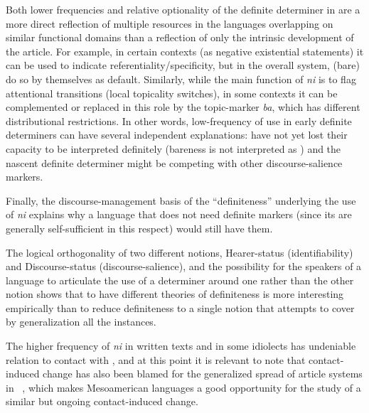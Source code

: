\documentclass[output=paper
,modfonts
,nonflat]{langsci/langscibook}
\begin{document}
Both lower frequencies and relative optionality of the definite determiner in  are a more direct reflection of multiple resources in the languages overlapping on similar functional domains than a reflection of only the intrinsic development of the article. For example, in certain contexts (as negative existential statements) it can be used to indicate referentiality/specificity, but in the overall system, (bare)  do so by themselves as default. Similarly, while the main function of \textit{ni} is to flag attentional transitions (local topicality switches), in some contexts it can be complemented or replaced in this role by the topic-marker \textit{ba}, which has different distributional restrictions. In other words, low-frequency of use in early definite determiners can have several independent explanations:  have not yet lost their capacity to be interpreted definitely (bareness is not interpreted as ) and the nascent definite determiner might be competing with other discourse-salience markers.

Finally, the discourse-management basis of the ``definiteness'' underlying the use of \textit{ni} explains why a language that does not need definite markers (since its  are generally self-sufficient in this respect) would still have them.

The logical orthogonality of two different notions, Hearer-status (identifiability) and Discourse-status (discourse-salience), and the possibility for the speakers of a language to articulate the use of a determiner around one rather than the other notion shows that to have different theories of definiteness is more interesting empirically than to reduce definiteness to a single notion that attempts to cover by generalization all the instances.  

The higher frequency of \textit{ni} in written texts and in some idiolects has undeniable relation to contact with , and at this point it is relevant to note that contact-induced change has also been blamed for the generalized spread of article systems in ~\citep{Schroeder2006}, which makes Mesoamerican languages a good opportunity for the study of a similar but ongoing contact-induced change.
\end{document}
